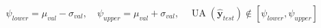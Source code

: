 ﻿\documentclass{article}
\begin{document}
\begin{preview}
\(\displaystyle
\begin{gathered}
  \psi_{lower}=\mu_{val}-\sigma_{val}, \quad
  \psi_{upper}=\mu_{val}+\sigma_{val}, \quad
  \operatorname{UA}(\hat{\bm y}_{test})
  \notin[\psi_{lower},\psi_{upper}]
\end{gathered}
\)
\end{preview}
\end{document}
